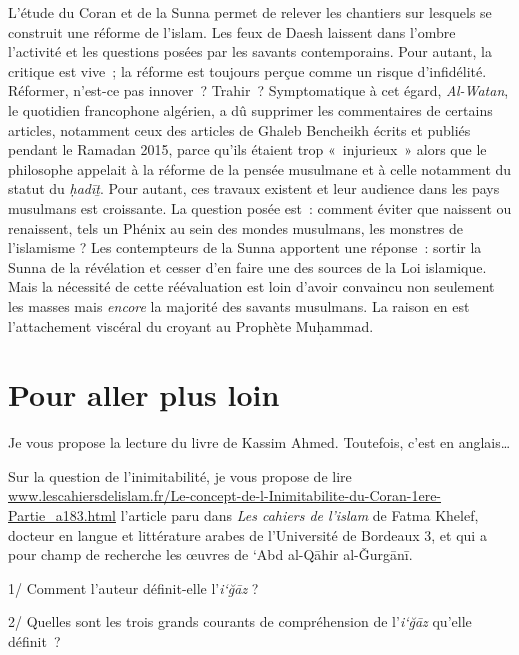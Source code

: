 L'étude du Coran et de la Sunna permet de relever les chantiers sur
lesquels se construit une réforme de l'islam. Les feux de Daesh laissent
dans l'ombre l'activité et les questions posées par les savants
contemporains. Pour autant, la critique est vive~; la réforme est
toujours perçue comme un risque d'infidélité. Réformer, n'est-ce pas
innover~? Trahir~? Symptomatique à cet égard, \emph{Al-Watan}, le
quotidien francophone algérien, a dû supprimer les commentaires de
certains articles, notamment ceux des articles de Ghaleb Bencheikh
écrits et publiés pendant le Ramadan 2015, parce qu'ils étaient trop
«~injurieux~» alors que le philosophe appelait à la réforme de la pensée
musulmane et à celle notamment du statut du \emph{ḥadīṯ}. Pour autant,
ces travaux existent et leur audience dans les pays musulmans est
croissante. La question posée est~: comment éviter que naissent ou
renaissent, tels un Phénix au sein des mondes musulmans, les monstres de
l'islamisme ? Les contempteurs de la Sunna apportent une réponse~:
sortir la Sunna de la révélation et cesser d'en faire une des sources de
la Loi islamique. Mais la nécessité de cette réévaluation est loin
d'avoir convaincu non seulement les masses mais \emph{encore} la
majorité des savants musulmans. La raison en est l'attachement viscéral
du croyant au Prophète Muḥammad.

\section{Pour aller plus loin}

 
{Je vous propose la lecture du livre de
Kassim Ahmed. Toutefois, c'est en anglais\ldots{}
}

Sur la question de l'inimitabilité, je vous propose de lire
\url{www.lescahiersdelislam.fr/Le-concept-de-l-Inimitabilite-du-Coran-1ere-Partie_a183.html} {l'article}
paru dans \emph{Les cahiers de l'islam} de Fatma Khelef, docteur en
langue et littérature arabes de l'Université de Bordeaux 3, et qui a
pour champ de recherche les œuvres de `Abd al-Qāhir al-Ǧurgānī.

1/ Comment l'auteur définit-elle l'\emph{i`ğāz} ?

2/ Quelles sont les trois grands courants de compréhension de
l'\emph{i`ğāz} qu'elle définit~?

